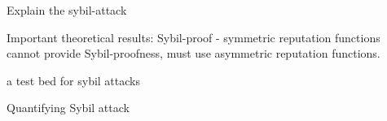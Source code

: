 Explain the sybil-attack

Important theoretical results:
Sybil-proof\cite{cheng2005sybilproof} - symmetric reputation functions cannot
provide Sybil-proofness, must use asymmetric reputation functions.

a test bed for sybil attacks\cite{irissappane2012towards}

Quantifying Sybil attack\cite{margolin2008quantifying}

